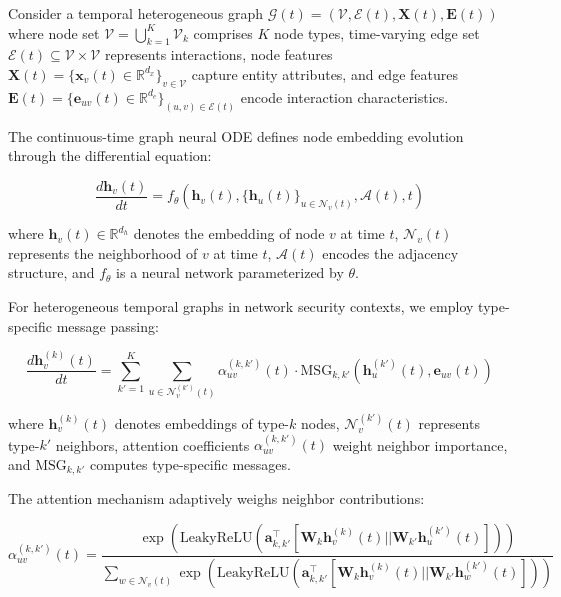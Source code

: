 Consider a temporal heterogeneous graph $\mathcal{G}(t) = (\mathcal{V}, \mathcal{E}(t), \mathbf{X}(t), \mathbf{E}(t))$ where node set $\mathcal{V} = \bigcup_{k=1}^K \mathcal{V}_k$ comprises $K$ node types, time-varying edge set $\mathcal{E}(t) \subseteq \mathcal{V} \times \mathcal{V}$ represents interactions, node features $\mathbf{X}(t) = \{\mathbf{x}_v(t) \in \mathbb{R}^{d_x}\}_{v \in \mathcal{V}}$ capture entity attributes, and edge features $\mathbf{E}(t) = \{\mathbf{e}_{uv}(t) \in \mathbb{R}^{d_e}\}_{(u,v) \in \mathcal{E}(t)}$ encode interaction characteristics.

The continuous-time graph neural ODE defines node embedding evolution through the differential equation:

\begin{equation}
\frac{d\mathbf{h}_v(t)}{dt} = f_\theta(\mathbf{h}_v(t), \{\mathbf{h}_u(t)\}_{u \in \mathcal{N}_v(t)}, \mathcal{A}(t), t)
\end{equation}

where $\mathbf{h}_v(t) \in \mathbb{R}^{d_h}$ denotes the embedding of node $v$ at time $t$, $\mathcal{N}_v(t)$ represents the neighborhood of $v$ at time $t$, $\mathcal{A}(t)$ encodes the adjacency structure, and $f_\theta$ is a neural network parameterized by $\theta$.

For heterogeneous temporal graphs in network security contexts, we employ type-specific message passing:

\begin{equation}
\frac{d\mathbf{h}_v^{(k)}(t)}{dt} = \sum_{k'=1}^K \sum_{u \in \mathcal{N}_v^{(k')}(t)} \alpha_{uv}^{(k,k')}(t) \cdot \text{MSG}_{k,k'}(\mathbf{h}_u^{(k')}(t), \mathbf{e}_{uv}(t))
\end{equation}

where $\mathbf{h}_v^{(k)}(t)$ denotes embeddings of type-$k$ nodes, $\mathcal{N}_v^{(k')}(t)$ represents type-$k'$ neighbors, attention coefficients $\alpha_{uv}^{(k,k')}(t)$ weight neighbor importance, and $\text{MSG}_{k,k'}$ computes type-specific messages.

The attention mechanism adaptively weighs neighbor contributions:

\begin{equation}
\alpha_{uv}^{(k,k')}(t) = \frac{\exp(\text{LeakyReLU}(\mathbf{a}_{k,k'}^\top [\mathbf{W}_k\mathbf{h}_v^{(k)}(t) || \mathbf{W}_{k'}\mathbf{h}_u^{(k')}(t)]))}{\sum_{w \in \mathcal{N}_v(t)} \exp(\text{LeakyReLU}(\mathbf{a}_{k,k'}^\top [\mathbf{W}_k\mathbf{h}_v^{(k)}(t) || \mathbf{W}_{k'}\mathbf{h}_w^{(k')}(t)]))}
\end{equation}

